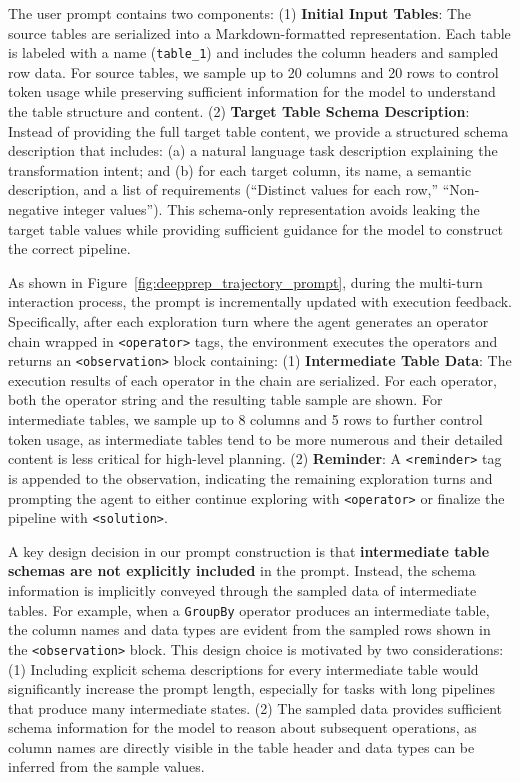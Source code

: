 The user prompt contains two components:
(1) \textbf{Initial Input Tables}: The source tables are serialized into a Markdown-formatted representation. Each table is labeled with a name (\eg \texttt{table\_1}) and includes the column headers and sampled row data. For source tables, we sample up to 20 columns and 20 rows to control token usage while preserving sufficient information for the model to understand the table structure and content.
(2) \textbf{Target Table Schema Description}: Instead of providing the full target table content, we provide a structured schema description that includes: (a) a natural language task description explaining the transformation intent; and (b) for each target column, its name, a semantic description, and a list of requirements (\eg ``Distinct values for each row,'' ``Non-negative integer values''). This schema-only representation avoids leaking the target table values while providing sufficient guidance for the model to construct the correct pipeline.

As shown in Figure~\ref{fig:deepprep_trajectory_prompt}, during the multi-turn interaction process, the prompt is incrementally updated with execution feedback.
Specifically, after each exploration turn where the agent generates an operator chain wrapped in \texttt{<operator>} tags, the environment executes the operators and returns an \texttt{<observation>} block containing:
(1) \textbf{Intermediate Table Data}: The execution results of each operator in the chain are serialized. For each operator, both the operator string and the resulting table sample are shown. For intermediate tables, we sample up to 8 columns and 5 rows to further control token usage, as intermediate tables tend to be more numerous and their detailed content is less critical for high-level planning.
(2) \textbf{Reminder}: A \texttt{<reminder>} tag is appended to the observation, indicating the remaining exploration turns and prompting the agent to either continue exploring with \texttt{<operator>} or finalize the pipeline with \texttt{<solution>}.

A key design decision in our prompt construction is that \textbf{intermediate table schemas are not explicitly included} in the prompt. Instead, the schema information is implicitly conveyed through the sampled data of intermediate tables. For example, when a \texttt{GroupBy} operator produces an intermediate table, the column names and data types are evident from the sampled rows shown in the \texttt{<observation>} block. This design choice is motivated by two considerations:
(1) Including explicit schema descriptions for every intermediate table would significantly increase the prompt length, especially for tasks with long pipelines that produce many intermediate states.
(2) The sampled data provides sufficient schema information for the model to reason about subsequent operations, as column names are directly visible in the table header and data types can be inferred from the sample values.

